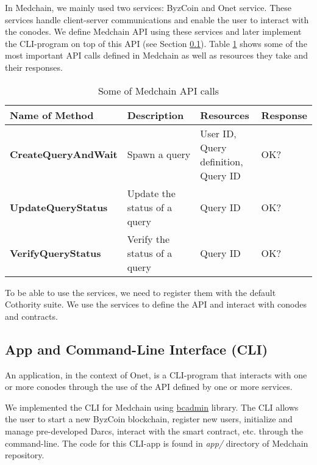 In Medchain, we mainly used two services: ByzCoin and Onet service. These services handle client-server communications and enable the user to interact with the conodes. We define Medchain API using these services and later implement the CLI-program on top of this API (see Section \ref{impl:cli}). Table \ref{tbl:med_api_calls} shows some of the most important API calls defined in Medchain as well as resources they take and their responses.

\begin{table}[ht]
\centering
\caption{Some of Medchain API calls}
\label{tbl:med_api_calls}
\begin{tabular}{|l|l|l|l|}
\hline
\textbf{Name of Method} & \textbf{Description} & \textbf{Resources} & \textbf{Response}\\
\hline
\textbf{CreateQueryAndWait}    &  Spawn a query & \pbox{20cm}{ User ID, \\ Query definition, \\ Query ID }  & OK?\\
\hline
\textbf{UpdateQueryStatus} & Update the status of a query & Query ID  &  OK? \\
\hline
\textbf{VerifyQueryStatus} & Verify the status of a query & Query ID  &  OK? \\
\hline
 
\end{tabular}
\end{table}

To be able to use the services, we need to register them with the default Cothority suite. We use the services to define the API and interact with conodes and contracts.


\subsection{App and Command-Line Interface (CLI)}\label{impl:cli}
An application, in the context of Onet, is a CLI-program that interacts with one or more conodes through the use of the API defined by one or more services. 

We implemented the CLI for Medchain using \href{https://github.com/dedis/cothority/tree/master/byzcoin/bcadmin}{bcadmin} library. The CLI allows the user to start a new ByzCoin blockchain, register new users, initialize and manage pre-developed Darcs, interact with the smart contract, etc. through the command-line. The code for this CLI-app is found in \textit{app/} directory of Medchain repository. 

